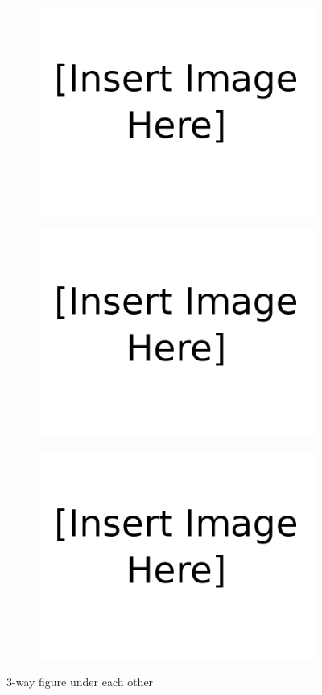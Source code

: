 \begin{figure}[H]
\centering
\begin{subfigure}[b]{0.7\textwidth}
   \includegraphics[width=0.7\linewidth]{figures/Insert_image_here.png}
   \caption{}
   \label{fig:test1.1} 
\end{subfigure}
\begin{subfigure}[b]{0.7\textwidth}
   \includegraphics[width=0.7\linewidth]{figures/Insert_image_here.png}
   \caption{}
   \label{fig:test1.2}
\end{subfigure}
\begin{subfigure}[b]{0.7\textwidth}
   \includegraphics[width=0.7\linewidth]{figures/Insert_image_here.png}
   \caption{}
   \label{fig:test1.3}
\end{subfigure}
\caption{3-way figure under each other}
\label{3-way figure under each other}
\end{figure}
